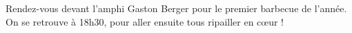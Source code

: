 Rendez-vous devant l'amphi Gaston Berger pour le premier barbecue de l'année.
On se retrouve à 18h30, pour aller ensuite tous ripailler en cœur !
